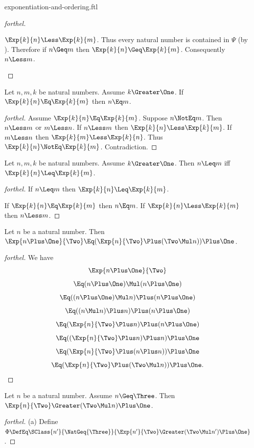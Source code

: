 \documentclass{stex}
\begin{document}
\begin{smodule}{exponentiation-and-ordering.ftl}
\begin{proof}[forthel]
\begin{case}{$\Exp{k}{n} \Less \Exp{k}{m}$.}
    Thus every natural number is contained in $\Psi$ (by ).
    Therefore if $n \Geq m$ then $\Exp{k}{n} \Geq \Exp{k}{m}$.
    Consequently $n \Less m$.
  \end{case}
\end{proof}

\begin{proposition*}[forthel]
  Let $n, m, k$ be natural numbers.
  Assume $k \Greater \One$.
  If $\Exp{k}{n} \Eq \Exp{k}{m}$ then $n \Eq m$.
\end{proposition*}
\begin{proof}[forthel]
  Assume $\Exp{k}{n} \Eq \Exp{k}{m}$.
  Suppose $n \NotEq m$.
  Then $n \Less m$ or $m \Less n$.
  If $n \Less m$ then $\Exp{k}{n} \Less \Exp{k}{m}$.
  If $m \Less n$ then $\Exp{k}{m} \Less \Exp{k}{n}$.
  Thus $\Exp{k}{n} \NotEq \Exp{k}{m}$.
  Contradiction.
\end{proof}

\begin{proposition*}[forthel]
  Let $n, m, k$ be natural numbers.
  Assume $k \Greater \One$.
  Then $n \Leq m$ iff $\Exp{k}{n} \Leq \Exp{k}{m}$.
\end{proposition*}
\begin{proof}[forthel]
  If $n \Leq m$ then $\Exp{k}{n} \Leq \Exp{k}{m}$.

  If $\Exp{k}{n} \Eq \Exp{k}{m}$ then $n \Eq m$.
  If $\Exp{k}{n} \Less \Exp{k}{m}$ then $n \Less m$.
\end{proof}

\begin{proposition*}[forthel]
  Let $n$ be a natural number.
  Then $\Exp{n \Plus \One}{\Two} \Eq (\Exp{n}{\Two} \Plus (\Two \Mul n)) \Plus \One$.
\end{proposition*}
\begin{proof}[forthel]
  We have
  \[  \Exp{n \Plus \One}{\Two}                       \]
  \[    \Eq (n \Plus \One) \Mul (n \Plus \One)         \]
  \[    \Eq ((n \Plus \One) \Mul n) \Plus (n \Plus \One)   \]
  \[    \Eq ((n \Mul n) \Plus n) \Plus (n \Plus \One)   \]
  \[    \Eq (\Exp{n}{\Two} \Plus n) \Plus (n \Plus \One)         \]
  \[    \Eq ((\Exp{n}{\Two} \Plus n) \Plus n) \Plus \One         \]
  \[    \Eq (\Exp{n}{\Two} \Plus (n \Plus n)) \Plus \One         \]
  \[    \Eq (\Exp{n}{\Two} \Plus (\Two \Mul n)) \Plus \One.    \]
\end{proof}

\begin{proposition*}[forthel]
  Let $n$ be a natural number.
  Assume $n \Geq \Three$.
  Then $\Exp{n}{\Two} \Greater (\Two \Mul n) \Plus \One$.
\end{proposition*}
\begin{proof}[forthel]
  (a) Define $\Phi \DefEq \SClass{n'}{\NatGeq{\Three}}{\Exp{n'}{\Two} \Greater (\Two \Mul n') \Plus \One}$.


\end{proof}
\end{smodule}
\end{document}
